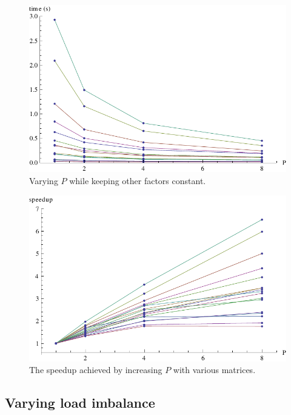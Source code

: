 \documentclass[a4paper]{article}
\begin{document}
\begin{figure}[h]
    \begin{center}
        \includegraphics[width=\plotsize]{img/time-run.pdf}
    \end{center}
    \caption{Varying $P$ while keeping other factors constant.}
    \label{fig:time-run}
\end{figure}


\begin{figure}[h]
    \begin{center}
        \includegraphics[width=\plotsize]{img/speedup.pdf}
    \end{center}
    \caption{The speedup achieved by increasing $P$ with various matrices.}
    \label{fig:speedup}
\end{figure}

\subsection{Varying load imbalance}\label{sec:imbalance-run}
\end{document}
